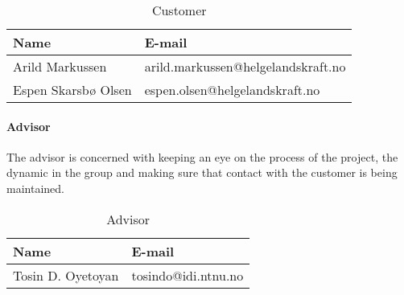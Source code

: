 \begin{table}[H]

\begin{center}
    \begin{tabular}{| l | l |}
   	\hline
    {\bf Name} & {\bf E-mail} \\ \hline \hline
    Arild Markussen & arild.markussen@helgelandskraft.no \\ \hline
    Espen Skarsbø Olsen & espen.olsen@helgelandskraft.no \\
    \hline
    \end{tabular}
\end{center}

\caption{Customer}
\end{table}

\paragraph{Advisor}

The advisor is concerned with keeping an eye on the process of the project, the dynamic in the group and making sure that contact with the customer is being maintained. 

\begin{table}[H]

\begin{center}
    \begin{tabular}{| l | l |}
    \hline
    {\bf Name} & {\bf E-mail} \\ \hline \hline
    Tosin D. Oyetoyan & tosindo@idi.ntnu.no \\ \hline
    \hline
    \end{tabular}
\end{center}

\caption{Advisor}
\end{table}